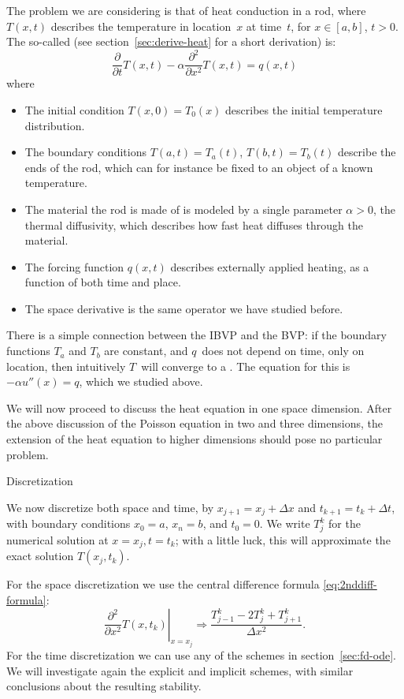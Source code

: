 The problem we are considering is that of  heat conduction in a rod, where
$T(x,t)$ describes the temperature in location~$x$ at time~$t$, for
$x\in[a,b]$, $t>0$. The so-called 
(see section~\ref{sec:derive-heat} for a short derivation)
is:
\begin{equation}
  \frac\partial{\partial t}T(x,t)-\alpha\frac{\partial^2}{\partial x^2}T(x,t)
  =q(x,t) 
\end{equation}
where
\begin{itemize}
\item The initial condition $T(x,0)=T_0(x)$ describes the initial
  temperature distribution.
\item The boundary conditions $T(a,t)=T_a(t)$, $T(b,t)=T_b(t)$
  describe the ends of the rod, which can for instance be fixed to an
  object of a known temperature.
\item The material the rod is made of is modeled by a single parameter
  $\alpha>0$, the thermal diffusivity, which describes how fast heat
  diffuses through the material.
\item The forcing function $q(x,t)$ describes externally applied
  heating, as a function of both time and place.
\item The space derivative is the same operator we have studied before.
\end{itemize}
There is a simple connection between the \ac{IBVP} and the \ac{BVP}:
if the boundary functions $T_a$ and $T_b$ are constant, and $q$~does
not depend on time, only on location, then intuitively $T$~will
converge to a . 
The equation for this is $-\alpha u''(x)=q$, which we studied above.

We will now proceed to discuss the heat equation in one space dimension.
After the above discussion of the Poisson equation in two and three dimensions,
the extension of the heat equation to higher dimensions should pose
no particular problem.

 {Discretization}

We now discretize both space and time, by $x_{j+1}=x_j+\Delta x$ and
$t_{k+1}=t_k+\Delta t$, with boundary conditions $x_0=a$, $x_n=b$, 
and $t_0=0$. We write $T^k_j$ for the numerical solution at $x=x_j,t=t_k$;
with a little luck, this will approximate the exact
solution $T(x_j,t_k)$.

For the space discretization we use the central difference formula
\eqref{eq:2nddiff-formula}:
\begin{equation}
  \left.\frac{\partial^2}{\partial x^2}T(x,t_k)\right|_{x=x_j} 
  \Rightarrow
  \frac{T_{j-1}^k-2T_j^k+T_{j+1}^k}{\Delta x^2}.
\end{equation}
For the time discretization we can use any of the schemes in
section~\ref{sec:fd-ode}. We will investigate again the explicit and
implicit schemes, with similar conclusions about the
resulting stability.

